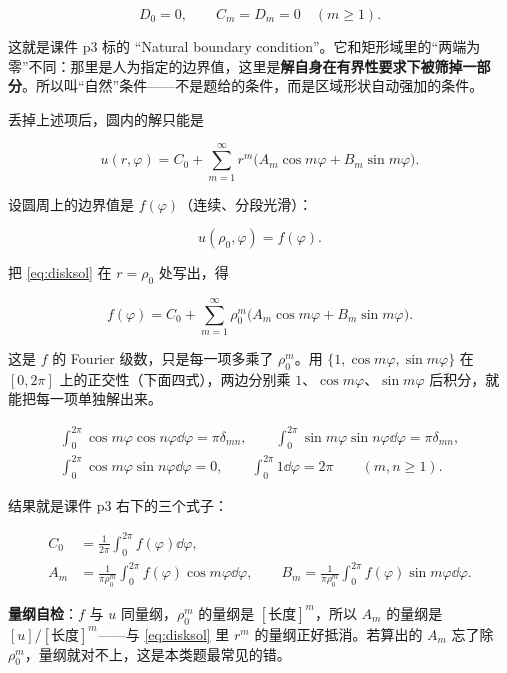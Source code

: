 \[
D_0=0,\qquad C_m=D_m=0\quad(m\ge1).
\]

这就是课件 p3 标的 “Natural boundary condition”。它和矩形域里的“两端为零”不同：那里是人为指定的边界值，这里是\textbf{解自身在有界性要求下被筛掉一部分}。所以叫“自然”条件——不是题给的条件，而是区域形状自动强加的条件。


丢掉上述项后，圆内的解只能是

\begin{equation}
u(r,\varphi)=C_0+\sum_{m=1}^{\infty}r^m\big(A_m\cos m\varphi+B_m\sin m\varphi\big).
\label{eq:disksol}
\end{equation}

设圆周上的边界值是 $f(\varphi)$（连续、分段光滑）：

\begin{equation}
u(\rho_0,\varphi)=f(\varphi).
\label{eq:diskbc}
\end{equation}

把 \eqref{eq:disksol} 在 $r=\rho_0$ 处写出，得

\[
f(\varphi)=C_0+\sum_{m=1}^{\infty}\rho_0^m\big(A_m\cos m\varphi+B_m\sin m\varphi\big).
\]

这是 $f$ 的 Fourier 级数，只是每一项多乘了 $\rho_0^m$。用 $\{1,\cos m\varphi,\sin m\varphi\}$ 在 $[0,2\pi]$ 上的正交性（下面四式），两边分别乘 $1$、$\cos m\varphi$、$\sin m\varphi$ 后积分，就能把每一项单独解出来。

\begin{gather*}
\int_0^{2\pi}\cos m\varphi\cos n\varphi\dd\varphi=\pi\delta_{mn},\qquad
\int_0^{2\pi}\sin m\varphi\sin n\varphi\dd\varphi=\pi\delta_{mn},\\
\int_0^{2\pi}\cos m\varphi\sin n\varphi\dd\varphi=0,\qquad
\int_0^{2\pi}1\dd\varphi=2\pi\qquad(m,n\ge1).
\end{gather*}

结果就是课件 p3 右下的三个式子：

\begin{equation}
\begin{aligned}
C_0&=\frac1{2\pi}\int_0^{2\pi}f(\varphi)\dd\varphi,\\
A_m&=\frac1{\pi\rho_0^m}\int_0^{2\pi}f(\varphi)\cos m\varphi\dd\varphi,\qquad
B_m=\frac1{\pi\rho_0^m}\int_0^{2\pi}f(\varphi)\sin m\varphi\dd\varphi .
\end{aligned}
\label{eq:diskcoef}
\end{equation}

\textbf{量纲自检}：$f$ 与 $u$ 同量纲，$\rho_0^m$ 的量纲是 $[\text{长度}]^m$，所以 $A_m$ 的量纲是 $[u]/[\text{长度}]^m$——与 \eqref{eq:disksol} 里 $r^m$ 的量纲正好抵消。若算出的 $A_m$ 忘了除 $\rho_0^m$，量纲就对不上，这是本类题最常见的错。

